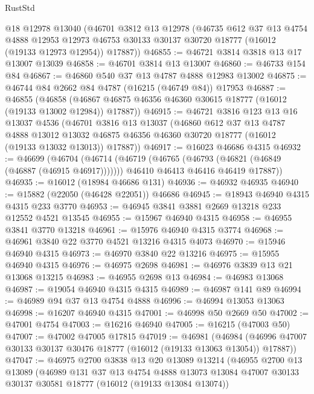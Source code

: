 \begin{lexlean}{RustStd}
\begin{coremodule}
    @18
    @12978
    @13040
    (@46701
      @3812
      @13
      @12978
      (@46735
        @612
        @37
        @13
        @4754
        @4888
        @12953
        @12973
        @46753
        @30133
        @30137
        @30720
        @18777
        (@16012 (@19133 @12973 @12954))
        @17887))
@46855 := @46721 @3814 @3818 @13 @17 @13007 @13039
@46858 := @46701 @3814 @13 @13007
@46860 := @46733 @154 @84
@46867 := @46860 @540 @37 @13 @4787 @4888 @12983 @13002
@46875 := @46744 @84 @2662 @84 @4787 (@16215 (@46749 @84)) @17953
@46887 := @46855
    (@46858 (@46867 @46875 @46356 @46360 @30615 @18777 (@16012 (@19133 @13002 @12984)) @17887))
@46915 := @46721
    @3816
    @123
    @13
    @16
    @13037
    @4536
    (@46701
      @3816
      @13
      @13037
      (@46860
        @612
        @37
        @13
        @4787
        @4888
        @13012
        @13032
        @46875
        @46356
        @46360
        @30720
        @18777
        (@16012 (@19133 @13032 @13013))
        @17887))
@46917 := @16023 @46686 @4315
@46932 := @46699
    (@46704
      (@46714
        (@46719 (@46765 (@46793 (@46821 (@46849 (@46887 (@46915 @46917)))))))
        @46410
        @46413
        @46416
        @46419
        @17887))
@46935 := @16012 (@18984 @46686 @131)
@46936 := @46932 @46935
@46940 := @15882 (@22050 (@46428 @22051)) @46686
@46945 := @18943 @46940 @4315 @4315 @233 @3770
@46953 := @46945 @3841 @3881 @2669 @13218 @233 @12552 @4521 @13545
@46955 := @15967 @46940 @4315
@46958 := @46955 @3841 @3770 @13218
@46961 := @15976 @46940 @4315 @3774
@46968 := @46961 @3840 @22 @3770 @4521 @13216 @4315 @4073
@46970 := @15946 @46940 @4315
@46973 := @46970 @3840 @22 @13216
@46975 := @15955 @46940 @4315
@46976 := @46975 @2698
@46981 := @46976 @3839 @13 @21 @13068 @13215
@46983 := @46955 @2698 @13
@46984 := @46983 @13068
@46987 := @19054 @46940 @4315 @4315
@46989 := @46987 @141 @89
@46994 := @46989 @94 @37 @13 @4754 @4888
@46996 := @46994 @13053 @13063
@46998 := @16207 @46940 @4315
@47001 := @46998 @50 @2669 @50
@47002 := @47001 @4754
@47003 := @16216 @46940
@47005 := @16215 (@47003 @50)
@47007 := @47002 @47005 @17815
@47019 := @46981
    (@46984 (@46996 @47007 @30133 @30137 @30476 @18777 (@16012 (@19133 @13063 @13054)) @17887))
@47047 := @46975
    @2700
    @3838
    @13
    @20
    @13089
    @13214
    (@46955
      @2700
      @13
      @13089
      (@46989
        @131
        @37
        @13
        @4754
        @4888
        @13073
        @13084
        @47007
        @30133
        @30137
        @30581
        @18777
        (@16012 (@19133 @13084 @13074))

\end{coremodule}
\end{lexlean}
